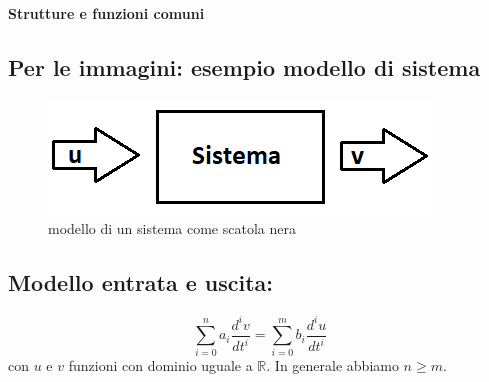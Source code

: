 \documentclass[a4paper, 12pt, italian]{book}
\begin{document}
\begin{titlepage}

\begin{center}
\Huge{\textbf{Strutture e funzioni comuni}}\\
\end{center}

\end{titlepage}


% 

% 
%
%
%


\subsection*{Per le immagini: esempio modello di sistema}
\begin{figure}[h]
	\centering
	\includegraphics[width=0.7\linewidth]{immagini/sistema2}
	\caption{ modello di un sistema come scatola nera}
	\label{fig:sistema}
\end{figure}

\subsection*{Modello entrata e uscita:}
\begin{equation*}
\sum\limits_{i=0}^n a_{i} \frac{ d^{i} v }{ dt^{i}  } = \sum\limits_{i=0}^m b_{i} \frac{ d^{i} u }{ dt^{i}  }
\end{equation*}
con $u$ e $v$ funzioni con dominio uguale a $\mathbb{R}$. In generale abbiamo $n\geq m$.
\end{document}
